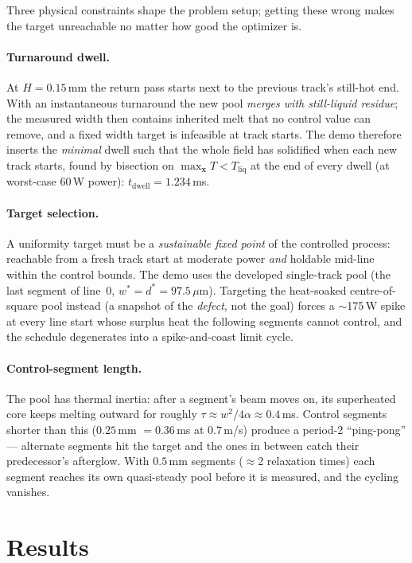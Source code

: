 \documentclass[11pt]{article}
\begin{document}
Three physical constraints shape the problem setup; getting these wrong makes
the target unreachable no matter how good the optimizer is.

\paragraph{Turnaround dwell.} At $H=0.15$\,mm the return pass starts next to
the previous track's still-hot end. With an instantaneous turnaround the new
pool \emph{merges with still-liquid residue}; the measured width then
contains inherited melt that no control value can remove, and a fixed width
target is infeasible at track starts. The demo therefore inserts the
\emph{minimal} dwell such that the whole field has solidified when each new
track starts, found by bisection on $\max_{\mathbf{x}} T < T_{\mathrm{liq}}$
at the end of every dwell (at worst-case 60\,W power):
$t_{\mathrm{dwell}} = 1.234$\,ms.

\paragraph{Target selection.} A uniformity target must be a
\emph{sustainable fixed point} of the controlled process: reachable from a
fresh track start at moderate power \emph{and} holdable mid-line within the
control bounds. The demo uses the developed single-track pool (the last
segment of line~0, $w^\ast = d^\ast = 97.5\,\mu$m). Targeting the
heat-soaked centre-of-square pool instead (a snapshot of the \emph{defect},
not the goal) forces a $\sim$175\,W spike at every line start whose surplus
heat the following segments cannot control, and the schedule degenerates
into a spike-and-coast limit cycle.

\paragraph{Control-segment length.} The pool has thermal inertia: after a
segment's beam moves on, its superheated core keeps melting outward for
roughly $\tau \approx w^2/4\alpha \approx 0.4$\,ms. Control segments shorter
than this ($0.25$\,mm $=0.36$\,ms at $0.7$\,m/s) produce a period-2
``ping-pong'' --- alternate segments hit the target and the ones in between
catch their predecessor's afterglow. With $0.5$\,mm segments ($\approx$2
relaxation times) each segment reaches its own quasi-steady pool before it is
measured, and the cycling vanishes.

\section{Results}
\end{document}
